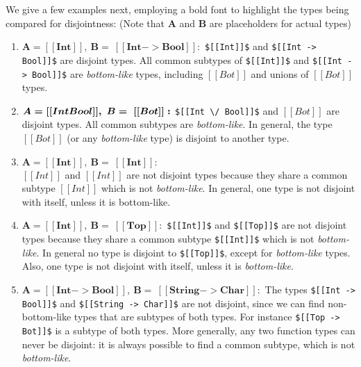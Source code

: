 We give a few examples next, employing a bold font to highlight the types
being compared for disjointness:
(Note that $\boldsymbol{A}$ and $\boldsymbol{B}$
are placeholders for actual types)


\begin{enumerate}
  \item $\boldsymbol{A = [[Int]], \ B = \ [[Int -> Bool]]:}$
        \lstinline{$[[Int]]$} and \lstinline{$[[Int -> Bool]]$} are disjoint types. All common subtypes
        of \lstinline{$[[Int]]$} and \lstinline{$[[Int -> Bool]]$} are \emph{bottom-like} types,
        including $[[Bot]]$ and unions of $[[Bot]]$ types.
  \item $\boldsymbol{A = [[Int \/ Bool]], \ B = \ [[Bot]]:}$
    \lstinline{$[[Int \/ Bool]]$} and $[[Bot]]$ are disjoint types. All common subtypes are \emph{bottom-like}.
    In general, the type $[[Bot]]$ (or any \emph{bottom-like} type)
    is disjoint to another type.
 \item $\boldsymbol{A = [[Int]], \ B = \ [[Int]]:}$ \\
       $[[Int]]$ and $[[Int]]$ are not disjoint types because they share a common subtype $[[Int]]$ which
       is not \emph{bottom-like}. In general, one type is not disjoint with
       itself, unless it is bottom-like.
  \item $\boldsymbol{A = [[Int]], \ B = \ [[Top]]:}$
        \lstinline{$[[Int]]$} and \lstinline{$[[Top]]$} are not disjoint types because they share a common
    subtype \lstinline{$[[Int]]$} which is not \emph{bottom-like}. In general no type
    is disjoint to \lstinline{$[[Top]]$}, except for \emph{bottom-like} types.
    Also, one type is not disjoint with itself, unless it is \emph{bottom-like}.
  \item $\boldsymbol{A = [[Int -> Bool]], \ B = \ [[String -> Char]]:}$
    The types \lstinline{$[[Int -> Bool]]$} and \lstinline{$[[String -> Char]]$} are not disjoint,
    since we can find non-bottom-like types that are subtypes
    of both types. For instance \lstinline{$[[Top -> Bot]]$} is a subtype of both types.
    More generally, any two function types can never be disjoint: it is always
    possible to find a common subtype, which is not \emph{bottom-like}.
\end{enumerate}


